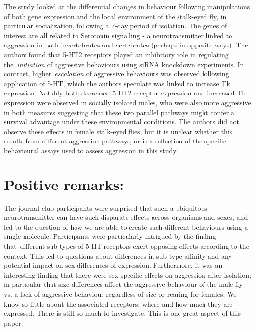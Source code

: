 \documentclass[10pt]{article}
\begin{document}
{\label{392870}}

The study looked at the differential changes in behaviour following
manipulations of both gene expression and the local environment of the
stalk-eyed fly, in particular socialization, following a 7-day period of
isolation. The genes of interest are all related to Serotonin signalling
- a neurotransmitter linked to aggression in both invertebrates and
vertebrates (perhaps in opposite ways). The authors found that 5-HT2
receptors played an inhibitory role in regulating the~\emph{initiation}
of aggressive behaviours using siRNA knockdown experiments. In contrast,
higher~\emph{escalation} of aggressive behaviours was observed following
application of 5-HT, which the authors speculate was linked to increase
Tk expression. Notably both decreased 5-HT2 receptor expression and
increased Tk expression were observed in socially isolated males, who
were also more aggressive in both measures suggesting that these two
parallel pathways might confer a survival advantage under these
environmental conditions. The authors did not observe these effects in
female stalk-eyed flies, but it is unclear whether this results from
different aggression pathways, or is a reflection of the specific
behavioural assays used to assess aggression in this study.

\par\null

\section*{Positive remarks:}

{\label{260841}}

The journal club participants were surprised that such a ubiquitous
neurotransmitter can have such disparate effects across organisms and
sexes, and led to the question of how we are able to create such
different behaviours using a single molecule. Participants were
particularly intrigued by the finding that~different sub-types of 5-HT
receptors exert opposing effects according to the context. This led to
questions about differences in sub-type affinity and any potential
impact on sex differences of expression. Furthermore, it was an
interesting finding that there were sex-specific effects on aggression
after isolation; in particular that size differences affect the
aggressive behaviour of the male fly vs. a lack of aggressive behaviour
regardless of size or rearing for females. We know so little about the
associated receptors: where and how much they are expressed. There is
still so much to investigate. This is one great aspect of this paper.~
\end{document}
